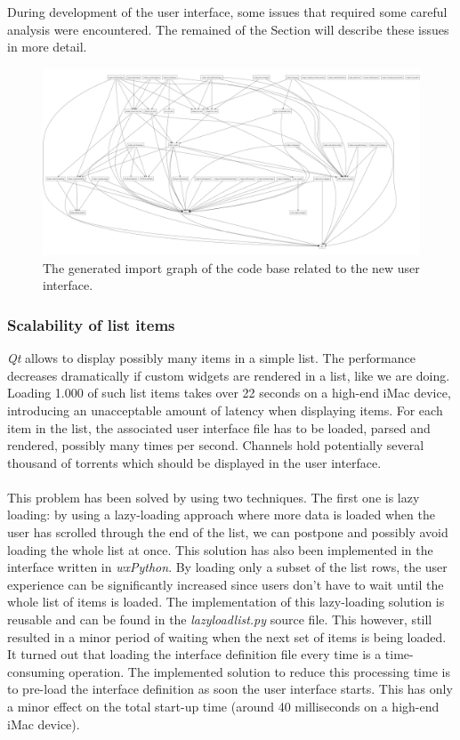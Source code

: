 During development of the user interface, some issues that required some careful analysis were encountered. The remained of the Section will describe these issues in more detail.

\begin{figure}[h!]
	\centering
	\includegraphics[width=1.0\columnwidth]{images/improving_qa/importgraph_new_gui}
	\caption{The generated import graph of the code base related to the new user interface.}
	\label{fig:importgraph-qt-gui}
\end{figure}

\subsubsection{\textbf{Scalability of list items}}
\emph{Qt} allows to display possibly many items in a simple list. The performance decreases dramatically if custom widgets are rendered in a list, like we are doing. Loading 1.000 of such list items takes over 22 seconds on a high-end iMac device, introducing an unacceptable amount of latency when displaying items. For each item in the list, the associated user interface file has to be loaded, parsed and rendered, possibly many times per second. Channels hold potentially several thousand of torrents which should be displayed in the user interface.\\\\
This problem has been solved by using two techniques. The first one is lazy loading: by using a lazy-loading approach where more data is loaded when the user has scrolled through the end of the list, we can postpone and possibly avoid loading the whole list at once. This solution has also been implemented in the interface written in \emph{wxPython}. By loading only a subset of the list rows, the user experience can be significantly increased since users don't have to wait until the whole list of items is loaded. The implementation of this lazy-loading solution is reusable and can be found in the \emph{lazyloadlist.py} source file. This however, still resulted in a minor period of waiting when the next set of items is being loaded. It turned out that loading the interface definition file every time is a time-consuming operation. The implemented solution to reduce this processing time is to pre-load the interface definition as soon the user interface starts. This has only a minor effect on the total start-up time (around 40 milliseconds on a high-end iMac device).

